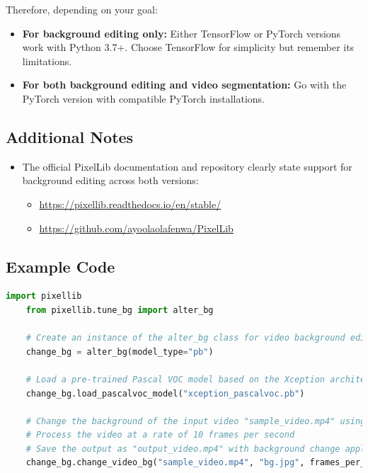 Therefore, depending on your goal:

\begin{itemize}[label=--]
    \item \textbf{For background editing only:} Either TensorFlow or PyTorch versions work with Python 3.7+. Choose TensorFlow for simplicity but remember its limitations.
    \item \textbf{For both background editing and video segmentation:} Go with the PyTorch version with compatible PyTorch installations.
\end{itemize}

\subsection*{Additional Notes}
\begin{itemize}[label=--]
    \item The official PixelLib documentation and repository clearly state support for background editing across both versions:
    \begin{itemize}[label=$\bullet$]
        \item \url{https://pixellib.readthedocs.io/en/stable/}
        \item \url{https://github.com/ayoolaolafenwa/PixelLib}
    \end{itemize}
\end{itemize}

\subsection{Example Code}
\begin{lstlisting}[language=Python]
    import pixellib
    from pixellib.tune_bg import alter_bg
    
    # Create an instance of the alter_bg class for video background editing
    change_bg = alter_bg(model_type="pb")
    
    # Load a pre-trained Pascal VOC model based on the Xception architecture
    change_bg.load_pascalvoc_model("xception_pascalvoc.pb")
    
    # Change the background of the input video "sample_video.mp4" using the background image "bg.jpg"
    # Process the video at a rate of 10 frames per second
    # Save the output as "output_video.mp4" with background change applied selectively on the detected person
    change_bg.change_video_bg("sample_video.mp4", "bg.jpg", frames_per_second=10, output_video_name="output_video.mp4", detect="person")
    
\end{lstlisting}


